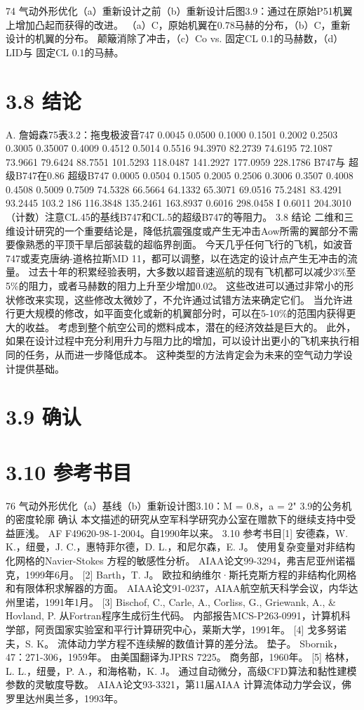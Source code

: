 \documentclass[UTF8,11pt,a4paper,openany,fontset=fandol]{ctexbook}
\begin{document}
74 气动外形优化（a）重新设计之前（b）重新设计后图3.9：通过在原始P51机翼上增加凸起而获得的改进。 （a）C，原始机翼在0.78马赫的分布，（b）C，重新设计的机翼的分布。 颠簸消除了冲击，（c）Co vs. 固定CL 0.1的马赫数，（d）LID与 固定CL 0.1的马赫。

\section{3.8 结论}
A. 詹姆森75表3.2：拖曳极波音747 0.0045 0.0500 0.1000 0.1501 0.2002 0.2503 0.3005 0.35007 0.4009 0.4512 0.5014 0.5516 94.3970 82.2739 74.6195 72.1087 73.9661 79.6424 88.7551 101.5293 118.0487 141.2927 177.0959 228.1786 B747与 超级B747在0.86 超级B747 0.0005 0.0504 0.1505 0.2005 0.2506 0.3006 0.3507 0.4008 0.4508 0.5009 0.7509 74.5328 66.5664 64.1332 65.3071 69.0516 75.2481 83.4291 93.2445 103.2 186 116.3848 135.2461 163.8937 0.6016 298.0458 I 0.6011 204.3010（计数）注意CL.45的基线B747和CL.5的超级B747的等阻力。 3.8 结论 二维和三维设计研究的一个重要结论是，降低抗震强度或产生无冲击Aow所需的翼部分不需要像熟悉的平顶干旱后部装载的超临界剖面。 今天几乎任何飞行的飞机，如波音747或麦克唐纳-道格拉斯MD 11，都可以调整，以在选定的设计点产生无冲击的流量。 过去十年的积累经验表明，大多数以超音速巡航的现有飞机都可以减少3\%至5\%的阻力，或者马赫数的阻力上升至少增加0.02。 这些改进可以通过非常小的形状修改来实现，这些修改太微妙了，不允许通过试错方法来确定它们。 当允许进行更大规模的修改，如平面变化或新的机翼部分时，可以在5-10\%的范围内获得更大的收益。 考虑到整个航空公司的燃料成本，潜在的经济效益是巨大的。 此外，如果在设计过程中充分利用升力与阻力比的增加，可以设计出更小的飞机来执行相同的任务，从而进一步降低成本。 这种类型的方法肯定会为未来的空气动力学设计提供基础。

\section{3.9 确认}
\section{3.10 参考书目}
76 气动外形优化（a）基线（b）重新设计图3.10：M = 0.8，a = 2" 3.9的公务机的密度轮廓 确认 本文描述的研究从空军科学研究办公室在赠款下的继续支持中受益匪浅。 AF F49620-98-1-2004。自1990年以来。 3.10 参考书目[1] 安德森，W. K.，纽曼，J. C.，惠特菲尔德，D. L.，和尼尔森，E. J。 使用复杂变量对非结构化网格的Navier-Stokes 方程的敏感性分析。 AIAA论文99-3294，弗吉尼亚州诺福克，1999年6月。 [2] Barth，T. J。 欧拉和纳维尔·斯托克斯方程的非结构化网格和有限体积求解器的方面。 AIAA论文91-0237，AIAA航空航天科学会议，内华达州里诺，1991年1月。 [3] Bischof, C., Carle, A., Corliss, G., Griewank, A., \& Hovland, P. 从Fortran程序生成衍生代码。 内部报告MCS-P263-0991，计算机科学部，阿贡国家实验室和平行计算研究中心，莱斯大学，1991年。 [4] 戈多努诺夫，S. K。 流体动力学方程不连续解的数值计算的差分法。 垫子。 Sbornik，47：271-306，1959年。 由美国翻译为JPRS 7225。 商务部，1960年。 [5] 格林，L. L.，纽曼，P. A.，和海格勒，K. J。 通过自动微分，高级CFD算法和黏性建模参数的灵敏度导数。 AIAA论文93-3321，第11届AIAA 计算流体动力学会议，佛罗里达州奥兰多，1993年。
\end{document}
